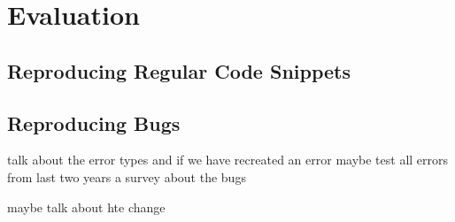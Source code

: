 
\chapter{Evaluation}\label{chapter:evaluation}

\section{Reproducing Regular Code Snippets}

\section{Reproducing Bugs}

talk about the error types 
and if we have recreated an error
maybe test all errors from last two years
a survey about the bugs

maybe talk about hte change